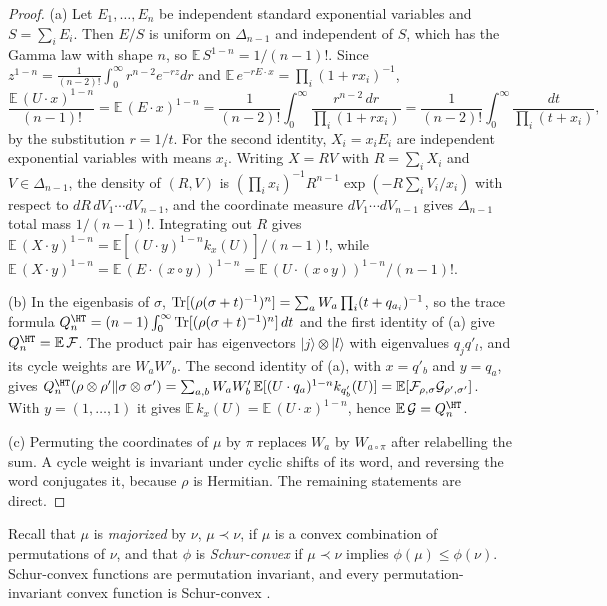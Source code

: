 \begin{proof}
(a) Let $E_1,\dots,E_n$ be independent standard exponential variables and $S=\sum_iE_i$. Then $E/S$ is uniform on $\Delta_{n-1}$ and independent of $S$, which has the Gamma law with shape $n$, so $\mathbb E\,S^{1-n}=1/(n-1)!$. Since $z^{1-n}=\frac1{(n-2)!}\int_0^\infty r^{n-2}e^{-rz}dr$ and $\mathbb E\,e^{-rE\cdot x}=\prod_i(1+rx_i)^{-1}$,
\[
\frac{\mathbb E\,(U\cdot x)^{1-n}}{(n-1)!}=\mathbb E\,(E\cdot x)^{1-n}=\frac1{(n-2)!}\int_0^\infty\frac{r^{n-2}\,dr}{\prod_i(1+rx_i)}=\frac1{(n-2)!}\int_0^\infty\frac{dt}{\prod_i(t+x_i)},
\]
by the substitution $r=1/t$. For the second identity, $X_i=x_iE_i$ are independent exponential variables with means $x_i$. Writing $X=RV$ with $R=\sum_iX_i$ and $V\in\Delta_{n-1}$, the density of $(R,V)$ is $(\prod_ix_i)^{-1}R^{n-1}\exp(-R\sum_iV_i/x_i)$ with respect to $dR\,dV_1\cdots dV_{n-1}$, and the coordinate measure $dV_1\cdots dV_{n-1}$ gives $\Delta_{n-1}$ total mass $1/(n-1)!$. Integrating out $R$ gives $\mathbb E\,(X\cdot y)^{1-n}=\mathbb E[(U\cdot y)^{1-n}k_x(U)]/(n-1)!$, while $\mathbb E\,(X\cdot y)^{1-n}=\mathbb E\,(E\cdot(x\circ y))^{1-n}=\mathbb E\,(U\cdot(x\circ y))^{1-n}/(n-1)!$.

(b) In the eigenbasis of $\sigma$, $\operatorname{Tr}[(\rho(\sigma+t)^{-1})^n]=\sum_aW_a\prod_i(t+q_{a_i})^{-1}$, so the trace formula $Q^\HT_n=(n-1)\int_0^\infty\Tr[(\rho(\sigma+t)^{-1})^n]\,dt$ and the first identity of (a) give $Q^\HT_n=\mathbb E\,\mathcal F$. The product pair has eigenvectors $|j\rangle\otimes|l\rangle$ with eigenvalues $q_jq'_l$, and its cycle weights are $W_aW'_b$. The second identity of (a), with $x=q'_b$ and $y=q_a$, gives $Q^\HT_n(\rho\otimes\rho'\|\sigma\otimes\sigma')=\sum_{a,b}W_aW'_b\,\mathbb E[(U\cdot q_a)^{1-n}k_{q'_b}(U)]=\mathbb E[\mathcal F_{\rho,\sigma}\mathcal G_{\rho',\sigma'}]$. With $y=(1,\dots,1)$ it gives $\mathbb E\,k_x(U)=\mathbb E\,(U\cdot x)^{1-n}$, hence $\mathbb E\,\mathcal G=Q^\HT_n$.

(c) Permuting the coordinates of $\mu$ by $\pi$ replaces $W_a$ by $W_{a\circ\pi}$ after relabelling the sum. A cycle weight is invariant under cyclic shifts of its word, and reversing the word conjugates it, because $\rho$ is Hermitian. The remaining statements are direct.
\end{proof}

Recall that $\mu$ is \emph{majorized} by $\nu$, $\mu\prec\nu$, if $\mu$ is a convex combination of permutations of $\nu$, and that $\phi$ is \emph{Schur-convex} if $\mu\prec\nu$ implies $\phi(\mu)\le\phi(\nu)$. Schur-convex functions are permutation invariant, and every permutation-invariant convex function is Schur-convex \cite[Ch.~3]{MarshallOlkinArnold2011}.

